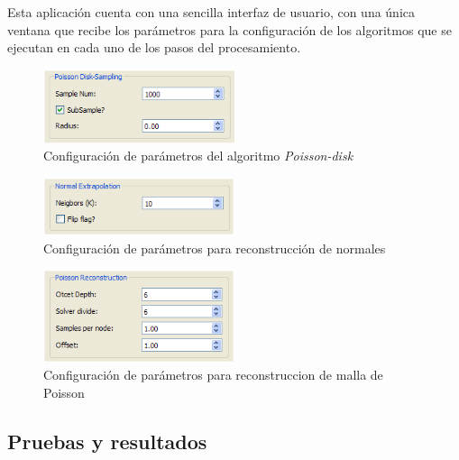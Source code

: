 Esta aplicación cuenta con una sencilla interfaz de usuario, con una única ventana que recibe los parámetros para la configuración de los algoritmos que se ejecutan en cada uno de los pasos del procesamiento.

\begin{figure}[H]
  \centering
    \includegraphics[width=0.5\textwidth]{./Cap2_videomapping/malla-poissongui.png}
  \caption[Imagen propia.]{Configuración de parámetros del algoritmo \emph{Poisson-disk}}
  \label{fig:Mesh-PoissonGui}
\end{figure}

\begin{figure}[H]
  \centering
    \includegraphics[width=0.5\textwidth]{./Cap2_videomapping/malla-normalextrapolation.png}
  \caption[Imagen propia.]{Configuración de parámetros para reconstrucción de normales}
  \label{fig:Mesh-Extrapolation}
\end{figure}

\begin{figure}[H]
  \centering
    \includegraphics[width=0.5\textwidth]{./Cap2_videomapping/malla-poissonreconstruction.png}
  \caption[Imagen propia.]{Configuración de parámetros para reconstruccion de malla de Poisson}
  \label{fig:Mesh-Normals}
\end{figure}

\subsection{Pruebas y resultados}

